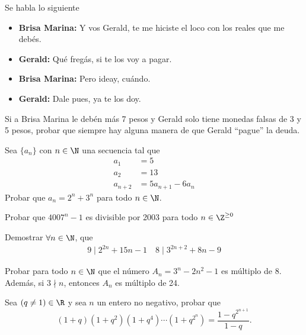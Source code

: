 \begin{multicols}{2}
    \begin{exercise}
        Se habla lo siguiente
        \begin{itemize}
            \item \textbf{Brisa Marina:} Y vos Gerald, te me hiciste el loco con los reales que me debés.
            \item \textbf{Gerald:} Qué fregás, si te los voy a pagar.
            \item \textbf{Brisa Marina:} Pero ideay, cuándo.
            \item \textbf{Gerald:} Dale pues, ya te los doy.
        \end{itemize}
        Si a Brisa Marina le debén más 7 pesos y Gerald solo tiene monedas falsas de 3 y 5 pesos, probar que siempre hay alguna manera de que Gerald ``pague'' la deuda.
    \end{exercise}

    \begin{exercise}
        Sea $\{a_n\}$ con $n \in \N$ una secuencia tal que
        \begin{align*}
            a_1 &= 5\\
            a_2 &= 13\\
            a_{n + 2} &= 5a_{n + 1} - 6a_n
        \end{align*}
        Probar que $a_n = 2^n + 3^n$ para todo $n \in \N$.
    \end{exercise}

    \begin{exercise}
        Probar que $4007^n - 1$ es divisible por 2003 para todo $n \in \Z^{\geq 0}$
    \end{exercise}

    \begin{exercise}
        Demostrar $\forall n \in \N$, que
        \begin{gather*}
            9 \mid 2^{2n} + 15n - 1 \quad
            8 \mid 3^{2n + 2} + 8n - 9
        \end{gather*}
    \end{exercise}

    \begin{exercise}
        Probar para todo $n \in \N$ que el número $A_n = 3^n - 2n^2 - 1$ es múltiplo de $8$.
        Además, si $3\nmid n$, entonces $A_n$ es múltiplo de 24.
    \end{exercise}

    \begin{exercise}
        Sea $(q \neq 1) \in \R$ y sea $n$ un entero no negativo, probar que
        \[
            (1 + q)(1 + q^2)(1 + q^4)\cdots(1 + q^{2^n}) = \frac{1 - q^{2^{n + 1}} }{1 - q}.
        \]
    \end{exercise}


\end{multicols}
